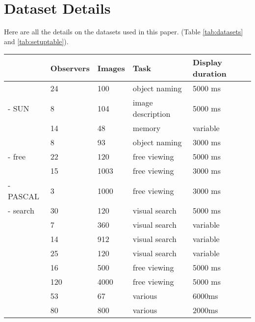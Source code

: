 \section{Dataset Details}

Here are all the details on the datasets used in this paper. (Table \ref{tab:datasets} and \ref{tab:setuptable}).


\begin{table*}
\centering
\small
\begin{tabular}{l|llll}
 						& Observers & Images &  Task & Display duration\\
\hline
\cite{clarke2013}     	& 24   	& 100   & object naming & 5000 ms\\
\cite{yun2013} - SUN    & 8     & 104   & image description & 5000 ms\\
\cite{tatler2005}     	& 14    & 48    & memory 			& variable\\
\cite{einhauser2008} 	& 8		& 93    & object naming 	& 3000 ms \\
\cite{tatler2007} - free & 22   & 120   & free viewing      & 5000 ms\\
\cite{judd2009}         & 15 	& 1003  & free viewing 		& 3000 ms\\
\cite{yun2013} - PASCAL & 3 	& 1000  & free viewing 		& 3000 ms\\
\cite{tatler2007} - search & 30 & 120	& visual search 	& 5000 ms\\
\hline
\cite{clarke2009} 		& 7		& 360	& visual search 	& variable\\
\cite{ehinger2009}     	& 14 	& 912 	& visual search 	& variable\\
\cite{asher2013}    	& 25    & 120   & visual search		& variable\\
\cite{jiang2014}  		& 16 	& 500 	& free viewing  	& 5000 ms \\
\cite{borji2015}  		& 120	& 4000  & free viewing		& 5000 ms\\
\hline
\cite{mills2011} 		& 53	& 67	& various  			& 6000ms\\
\cite{koehler2014}		& 80	& 800	& various			& 2000ms \\
\end{tabular}

\caption{Summary of the 13 datasets used throughout this study. The top eight datasets were used to train the model, while the bottom five were only used for evaluation.}
\label{tab:datasets}
\end{table*}

